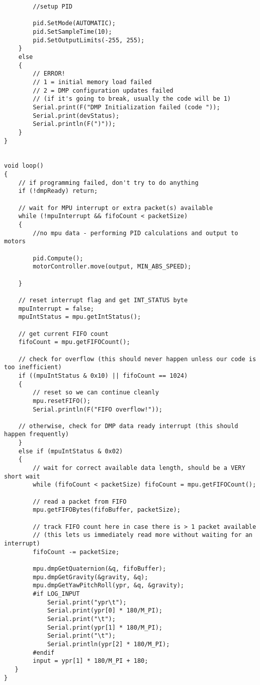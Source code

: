 \documentclass{report}
\begin{document}
\begin{verbatim}
        //setup PID
        
        pid.SetMode(AUTOMATIC);
        pid.SetSampleTime(10);
        pid.SetOutputLimits(-255, 255);  
    }
    else
    {
        // ERROR!
        // 1 = initial memory load failed
        // 2 = DMP configuration updates failed
        // (if it's going to break, usually the code will be 1)
        Serial.print(F("DMP Initialization failed (code "));
        Serial.print(devStatus);
        Serial.println(F(")"));
    }
}


void loop()
{
    // if programming failed, don't try to do anything
    if (!dmpReady) return;

    // wait for MPU interrupt or extra packet(s) available
    while (!mpuInterrupt && fifoCount < packetSize)
    {
        //no mpu data - performing PID calculations and output to motors
        
        pid.Compute();
        motorController.move(output, MIN_ABS_SPEED);
        
    }

    // reset interrupt flag and get INT_STATUS byte
    mpuInterrupt = false;
    mpuIntStatus = mpu.getIntStatus();

    // get current FIFO count
    fifoCount = mpu.getFIFOCount();

    // check for overflow (this should never happen unless our code is too inefficient)
    if ((mpuIntStatus & 0x10) || fifoCount == 1024)
    {
        // reset so we can continue cleanly
        mpu.resetFIFO();
        Serial.println(F("FIFO overflow!"));

    // otherwise, check for DMP data ready interrupt (this should happen frequently)
    }
    else if (mpuIntStatus & 0x02)
    {
        // wait for correct available data length, should be a VERY short wait
        while (fifoCount < packetSize) fifoCount = mpu.getFIFOCount();

        // read a packet from FIFO
        mpu.getFIFOBytes(fifoBuffer, packetSize);
        
        // track FIFO count here in case there is > 1 packet available
        // (this lets us immediately read more without waiting for an interrupt)
        fifoCount -= packetSize;

        mpu.dmpGetQuaternion(&q, fifoBuffer);
        mpu.dmpGetGravity(&gravity, &q);
        mpu.dmpGetYawPitchRoll(ypr, &q, &gravity);
        #if LOG_INPUT
            Serial.print("ypr\t");
            Serial.print(ypr[0] * 180/M_PI);
            Serial.print("\t");
            Serial.print(ypr[1] * 180/M_PI);
            Serial.print("\t");
            Serial.println(ypr[2] * 180/M_PI);
        #endif
        input = ypr[1] * 180/M_PI + 180;
   }
}
\end{verbatim}
\vspace{6cm}
\end{document}
